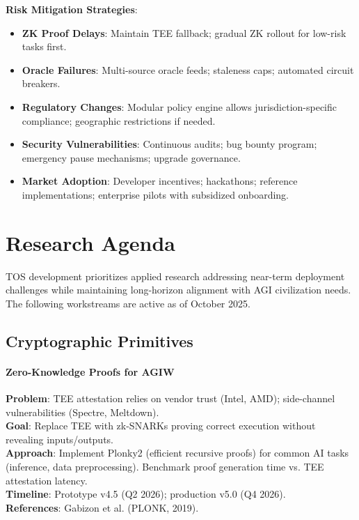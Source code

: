 \documentclass[11pt]{article}
\begin{document}
\textbf{Risk Mitigation Strategies}:
\begin{itemize}[noitemsep]
  \item \textbf{ZK Proof Delays}: Maintain TEE fallback; gradual ZK rollout for low-risk tasks first.
  \item \textbf{Oracle Failures}: Multi-source oracle feeds; staleness caps; automated circuit breakers.
  \item \textbf{Regulatory Changes}: Modular policy engine allows jurisdiction-specific compliance; geographic restrictions if needed.
  \item \textbf{Security Vulnerabilities}: Continuous audits; bug bounty program; emergency pause mechanisms; upgrade governance.
  \item \textbf{Market Adoption}: Developer incentives; hackathons; reference implementations; enterprise pilots with subsidized onboarding.
\end{itemize}

\section{Research Agenda}
\label{sec:research}

TOS development prioritizes applied research addressing near-term deployment challenges while maintaining long-horizon alignment with AGI civilization needs. The following workstreams are active as of October 2025.

\subsection{Cryptographic Primitives}

\paragraph{Zero-Knowledge Proofs for AGIW}
\textbf{Problem}: TEE attestation relies on vendor trust (Intel, AMD); side-channel vulnerabilities (Spectre, Meltdown).\\
\textbf{Goal}: Replace TEE with zk-SNARKs proving correct execution without revealing inputs/outputs.\\
\textbf{Approach}: Implement Plonky2 (efficient recursive proofs) for common AI tasks (inference, data preprocessing). Benchmark proof generation time vs. TEE attestation latency.\\
\textbf{Timeline}: Prototype v4.5 (Q2 2026); production v5.0 (Q4 2026).\\
\textbf{References}: Gabizon et al. (PLONK, 2019).
\end{document}
